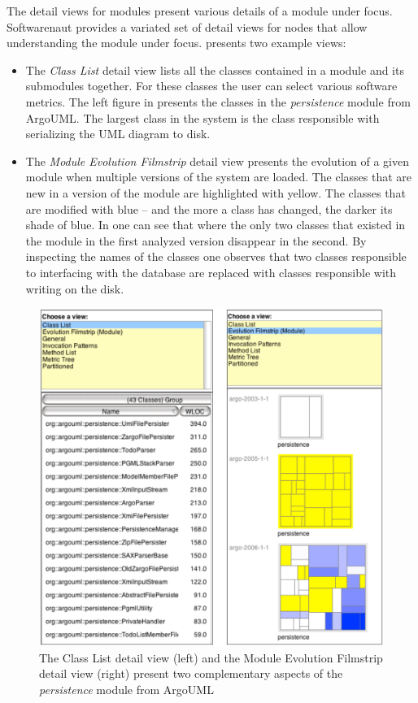 \documentclass[preprint,12pt]{elsarticle}
\begin{document}
The detail views for modules present various details of a module under focus. Softwarenaut provides a variated set of detail views for nodes that allow understanding the module under focus.  presents two example views: 

\begin{itemize}

\item The {\em Class List} detail view lists all the classes contained in a module and its submodules together. For these classes the user can select various software metrics. The left figure in  presents the classes in the {\em persistence} module from ArgoUML. The largest class in the system is the class responsible with serializing the UML diagram to disk.
\item The {\em Module Evolution Filmstrip} detail view presents the evolution of a given module when multiple versions of the system are loaded. The classes that are new in a version of the module are highlighted with yellow. The classes that are modified with blue -- and the more a class has changed, the darker its shade of blue. In  one can see that where the only two classes that existed in the module in the first analyzed version disappear in the second. By inspecting the names of the classes one observes that two classes responsible to interfacing with the database are replaced with classes responsible with writing on the disk.
\end{itemize}

\begin{figure}[t]
\begin{center}
\includegraphics[width=0.8\linewidth]{images/ModuleDetails}
\caption{The Class List detail view (left) and the Module Evolution Filmstrip detail view (right) present two complementary aspects of the {\em persistence} module from ArgoUML} 
\end{center}
\end{figure}
\end{document}
